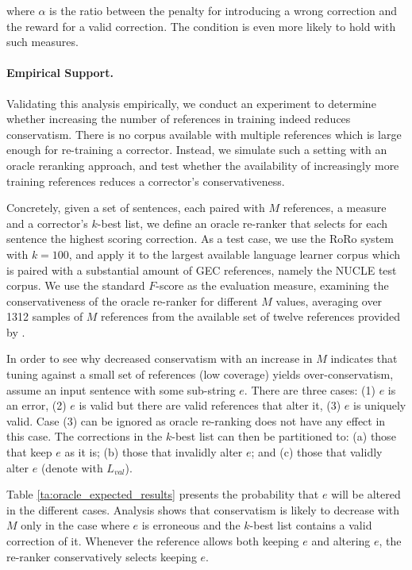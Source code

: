 \documentclass[letterpaper, 11pt]{article}
\begin{document}
\noindent
where $\alpha$ is the ratio between the penalty for introducing a wrong correction and the reward for a valid correction. The condition is even more likely to hold with such measures.

\paragraph{Empirical Support.}
Validating this analysis empirically, we conduct an experiment to determine whether increasing
the number of references in training indeed reduces conservatism. There is no 
corpus available with multiple references which is large enough for re-training a corrector. 
Instead, we simulate such a setting with an oracle reranking approach, and test whether the 
availability of increasingly more training references reduces a corrector's conservativeness.

Concretely, given a set of sentences, each paired with $M$ references, a measure and a 
corrector's $k$-best list, we define an oracle re-ranker that selects for each sentence the highest scoring correction.
As a test case, we use the RoRo system with $k=100$, and apply it to the 
largest available language learner corpus which is paired with a substantial amount of GEC references,
namely the NUCLE test corpus. We use the standard $F$-score as the evaluation measure,
examining the conservativeness of the oracle re-ranker for different $M$ values, averaging over 1312 samples of 
$M$ references from the available set of twelve references provided by \citet{bryant2015far}.

In order to see why decreased conservatism with an increase in $M$ indicates
that tuning against a small set of references (low coverage) yields over-conservatism, 
assume an input sentence with some sub-string $e$. 
There are three cases: (1) $e$ is an error, (2) $e$ is valid but there are valid references that alter it, (3) $e$ is uniquely valid. Case (3) can be ignored as oracle re-ranking does not have any effect in this case.
The corrections in the $k$-best list can then be partitioned to: (a) those that keep $e$ as it is; 
(b) those that invalidly alter $e$; and (c) those that validly alter $e$ (denote with $L_{val}$). 

Table \ref{ta:oracle_expected_results} presents the probability that $e$ will be altered in the different cases.
Analysis shows that conservatism is likely to decrease with $M$ only
  in the case where $e$ is erroneous and the $k$-best list contains a valid correction of it.
Whenever the reference allows both keeping $e$ and altering $e$, the re-ranker conservatively selects keeping $e$. 
\end{document}

